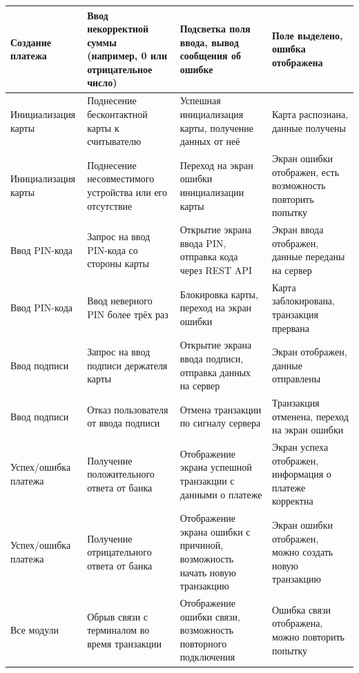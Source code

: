 \begin{longtable}[l]{| P{0.18\textwidth} | P{0.3\textwidth} | P{0.2\textwidth} | P{0.2\textwidth}|}
    Создание платежа &
    Ввод некорректной суммы (например, 0 или отрицательное число) &
    Подсветка поля ввода, вывод сообщения об ошибке &
    Поле выделено, ошибка отображена \\
    \hline

    Инициализация карты &
    Поднесение бесконтактной карты к считывателю &
    Успешная инициализация карты, получение данных от неё &
    Карта распознана, данные получены \\
    \hline

    Инициализация карты &
    Поднесение несовместимого устройства или его отсутствие &
    Переход на экран ошибки инициализации карты &
    Экран ошибки отображен, есть возможность повторить попытку \\
    \hline

    Ввод PIN-кода &
    Запрос на ввод PIN-кода со стороны карты &
    Открытие экрана ввода PIN, отправка кода через REST API &
    Экран ввода отображен, данные переданы на сервер \\
    \hline

    Ввод PIN-кода &
    Ввод неверного PIN более трёх раз &
    Блокировка карты, переход на экран ошибки &
    Карта заблокирована, транзакция прервана \\
    \hline

    Ввод подписи &
    Запрос на ввод подписи держателя карты &
    Открытие экрана ввода подписи, отправка данных на сервер &
    Экран отображен, данные отправлены \\
    \hline

    Ввод подписи &
    Отказ пользователя от ввода подписи &
    Отмена транзакции по сигналу сервера &
    Транзакция отменена, переход на экран ошибки \\
    \hline

    Успех/ошибка платежа &
    Получение положительного ответа от банка &
    Отображение экрана успешной транзакции с данными о платеже &
    Экран успеха отображен, информация о платеже корректна \\
    \hline

    Успех/ошибка платежа &
    Получение отрицательного ответа от банка &
    Отображение экрана ошибки с причиной, возможность начать новую транзакцию &
    Экран ошибки отображен, можно создать новую транзакцию \\
    \hline

    Все модули &
    Обрыв связи с терминалом во время транзакции &
    Отображение ошибки связи, возможность повторного подключения &
    Ошибка связи отображена, можно повторить попытку \\
    \hline
\end{longtable}


